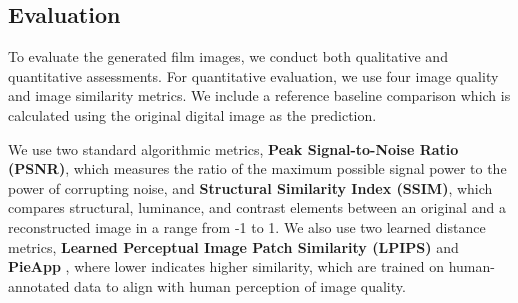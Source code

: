 \subsection{Evaluation}
\label{subsec:evaluation}

To evaluate the generated film images, we conduct both qualitative and
quantitative assessments. For quantitative evaluation, we use four image quality and image similarity metrics. We include a reference baseline comparison which is calculated using the original digital image as the prediction.

We use two standard algorithmic metrics, \textbf{Peak Signal-to-Noise Ratio (PSNR)}, which measures the ratio of the maximum possible signal power to the power of corrupting noise, and \textbf{Structural Similarity Index (SSIM)}, which compares structural, luminance, and contrast elements between an original and a reconstructed image in a range from -1 to 1. We also use two learned distance metrics, \textbf{Learned Perceptual Image Patch Similarity (LPIPS)} \cite{LPIPS} and \textbf{PieApp} \cite{PieAPP}, where lower indicates higher similarity, which are trained on human-annotated data to align with human perception of image quality.






